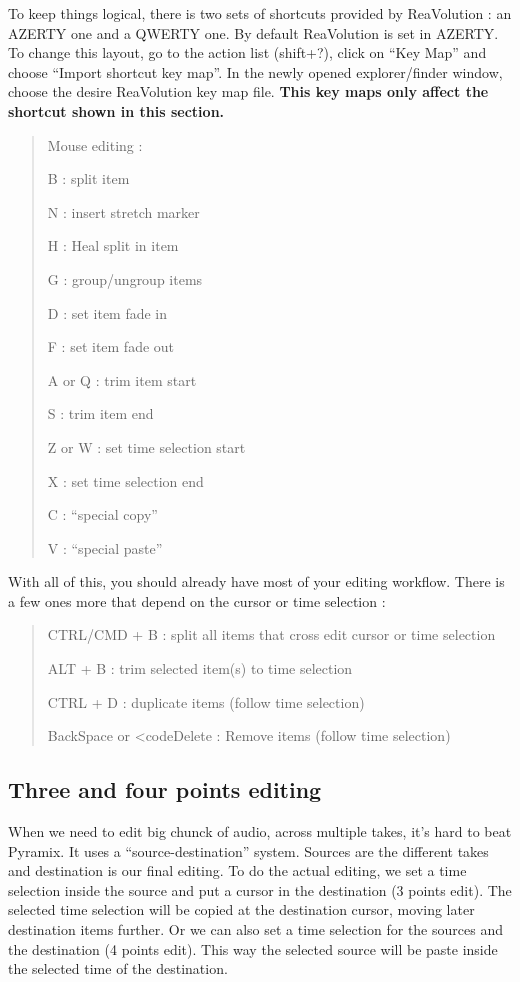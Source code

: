 \documentclass[
  letterpaper,
  DIV=11,
  numbers=noendperiod]{scrreport}
\begin{document}
To keep things logical, there is two sets of shortcuts provided by
ReaVolution : an AZERTY one and a QWERTY one. By default ReaVolution is
set in AZERTY. To change this layout, go to the action list (shift+?),
click on ``Key Map'' and choose ``Import shortcut key map''. In the
newly opened explorer/finder window, choose the desire ReaVolution key
map file. \textbf{This key maps only affect the shortcut shown in this
section.}

\begin{quote}
Mouse editing :

B : split item

N : insert stretch marker

H : Heal split in item

G : group/ungroup items

D : set item fade in

F : set item fade out

A or Q : trim item start

S : trim item end

Z or W : set time selection start

X : set time selection end

C : ``special copy''

V : ``special paste''
\end{quote}

With all of this, you should already have most of your editing workflow.
There is a few ones more that depend on the cursor or time selection :

\begin{quote}
CTRL/CMD + B : split all items that cross edit cursor or time selection

ALT + B : trim selected item(s) to time selection

CTRL + D : duplicate items (follow time selection)

BackSpace or \textless codeDelete : Remove items (follow time selection)
\end{quote}

\hypertarget{three-and-four-points-editing}{%
\subsection{Three and four points
editing}\label{three-and-four-points-editing}}

When we need to edit big chunck of audio, across multiple takes, it's
hard to beat Pyramix. It uses a ``source-destination'' system. Sources
are the different takes and destination is our final editing. To do the
actual editing, we set a time selection inside the source and put a
cursor in the destination (3 points edit). The selected time selection
will be copied at the destination cursor, moving later destination items
further. Or we can also set a time selection for the sources and the
destination (4 points edit). This way the selected source will be paste
inside the selected time of the destination.
\end{document}

